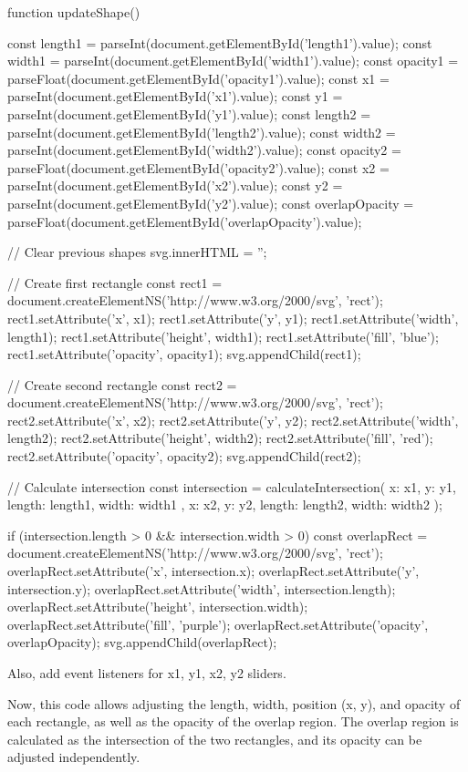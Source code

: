 function updateShape() {
  const length1 = parseInt(document.getElementById('length1').value);
  const width1 = parseInt(document.getElementById('width1').value);
  const opacity1 = parseFloat(document.getElementById('opacity1').value);
  const x1 = parseInt(document.getElementById('x1').value);
  const y1 = parseInt(document.getElementById('y1').value);
  const length2 = parseInt(document.getElementById('length2').value);
  const width2 = parseInt(document.getElementById('width2').value);
  const opacity2 = parseFloat(document.getElementById('opacity2').value);
  const x2 = parseInt(document.getElementById('x2').value);
  const y2 = parseInt(document.getElementById('y2').value);
  const overlapOpacity = parseFloat(document.getElementById('overlapOpacity').value);
  
  // Clear previous shapes
  svg.innerHTML = '';
  
  // Create first rectangle
  const rect1 = document.createElementNS('http://www.w3.org/2000/svg', 'rect');
  rect1.setAttribute('x', x1);
  rect1.setAttribute('y', y1);
  rect1.setAttribute('width', length1);
  rect1.setAttribute('height', width1);
  rect1.setAttribute('fill', 'blue');
  rect1.setAttribute('opacity', opacity1);
  svg.appendChild(rect1);
  
  // Create second rectangle
  const rect2 = document.createElementNS('http://www.w3.org/2000/svg', 'rect');
  rect2.setAttribute('x', x2);
  rect2.setAttribute('y', y2);
  rect2.setAttribute('width', length2);
  rect2.setAttribute('height', width2);
  rect2.setAttribute('fill', 'red');
  rect2.setAttribute('opacity', opacity2);
  svg.appendChild(rect2);
  
  // Calculate intersection
  const intersection = calculateIntersection({
    x: x1, y: y1, length: length1, width: width1
  }, {
    x: x2, y: y2, length: length2, width: width2
  });
  
  if (intersection.length > 0 && intersection.width > 0) {
    const overlapRect = document.createElementNS('http://www.w3.org/2000/svg', 'rect');
    overlapRect.setAttribute('x', intersection.x);
    overlapRect.setAttribute('y', intersection.y);
    overlapRect.setAttribute('width', intersection.length);
    overlapRect.setAttribute('height', intersection.width);
    overlapRect.setAttribute('fill', 'purple');
    overlapRect.setAttribute('opacity', overlapOpacity);
    svg.appendChild(overlapRect);
  }
}

Also, add event listeners for x1, y1, x2, y2 sliders.

Now, this code allows adjusting the length, width, position (x, y), and opacity of each rectangle, as well as the opacity of the overlap region. The overlap region is calculated as the intersection of the two rectangles, and its opacity can be adjusted independently.

